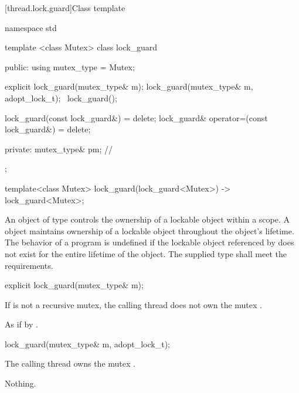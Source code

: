[thread.lock.guard]{Class template }

%
\begin{codeblock}
namespace std {
  template <class Mutex>
  class lock_guard {
  public:
    using mutex_type = Mutex;

    explicit lock_guard(mutex_type& m);
    lock_guard(mutex_type& m, adopt_lock_t);
    ~lock_guard();

    lock_guard(const lock_guard&) = delete;
    lock_guard& operator=(const lock_guard&) = delete;

  private:
    mutex_type& pm; // \expos
  };

  template<class Mutex> lock_guard(lock_guard<Mutex>) -> lock_guard<Mutex>;
}
\end{codeblock}

\pnum
An object of type  controls the ownership of a lockable object
within a scope. A  object maintains ownership of a lockable
object throughout the  object's lifetime.
The behavior of a program is undefined if the lockable object referenced by
 does not exist for the entire lifetime of the 
object. The supplied  type shall meet the 
requirements.

%
\begin{itemdecl}
explicit lock_guard(mutex_type& m);
\end{itemdecl}

\begin{itemdescr}
\pnum
\requires If  is not a recursive mutex,
the calling thread does not own the mutex .

\pnum
\effects As if by .

\pnum
\postconditions {}
\end{itemdescr}

%
\begin{itemdecl}
lock_guard(mutex_type& m, adopt_lock_t);
\end{itemdecl}

\begin{itemdescr}
\pnum
\requires The calling thread owns the mutex .

\pnum
\postconditions {}

\pnum
\throws Nothing.
\end{itemdescr}

